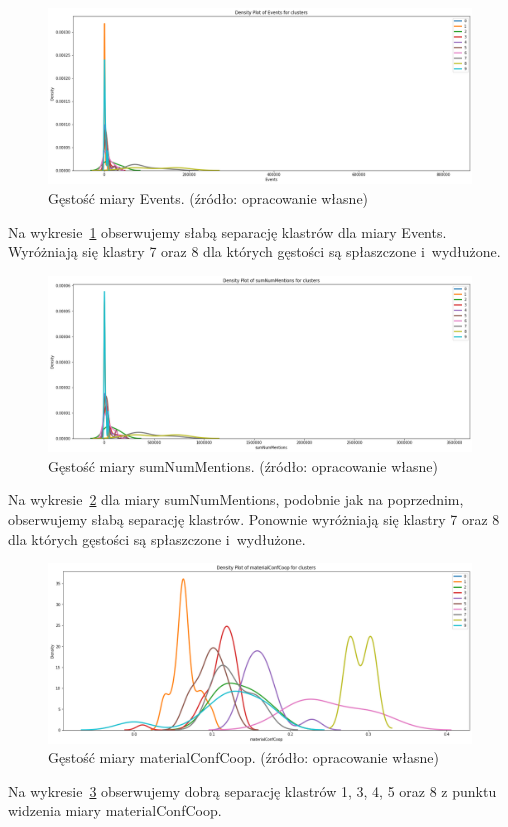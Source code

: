 \documentclass[11pt]{report}
\begin{document}
    \begin{figure}[!htp]
        \centering
        \includegraphics[width=\linewidth]{fig/CLUST/density_Events.png}
        \caption{Gęstość miary Events. (źródło: opracowanie własne)}
        \label{fig:density_events}
    \end{figure}
    Na wykresie~\ref{fig:density_events} obserwujemy słabą separację klastrów dla miary Events.
    Wyróżniają się klastry 7 oraz 8 dla których gęstości są spłaszczone i~wydłużone.

    \begin{figure}[!htp]
        \centering
        \includegraphics[width=\linewidth]{fig/CLUST/density_sumNumMentions.png}
        \caption{Gęstość miary sumNumMentions. (źródło: opracowanie własne)}
        \label{fig:density_sumnummentions}
    \end{figure}
    Na wykresie~\ref{fig:density_sumnummentions} dla miary sumNumMentions, podobnie jak na poprzednim, obserwujemy słabą separację klastrów.
    Ponownie wyróżniają się klastry 7 oraz 8 dla których gęstości są spłaszczone i~wydłużone.

    \begin{figure}[!htp]
        \centering
        \includegraphics[width=\linewidth]{fig/CLUST/density_materialConfCoop.png}
        \caption{Gęstość miary materialConfCoop. (źródło: opracowanie własne)}
        \label{fig:density_materialconfcoop}
    \end{figure}
    Na wykresie~\ref{fig:density_materialconfcoop} obserwujemy dobrą separację klastrów 1, 3, 4, 5 oraz 8 z punktu widzenia miary materialConfCoop.
\end{document}
